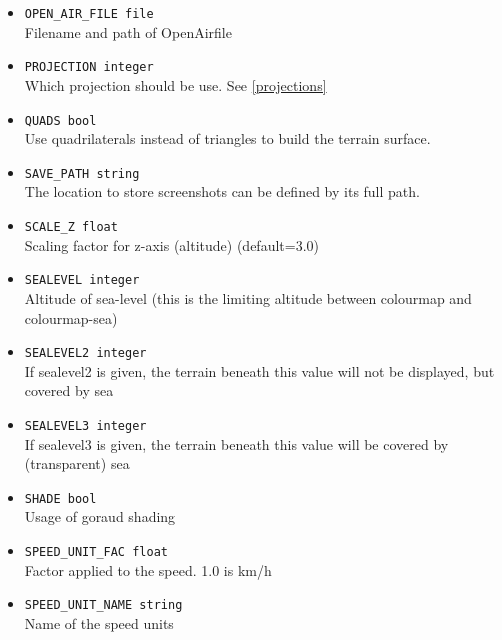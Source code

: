 \begin{itemize}

\item \texttt{OPEN\_AIR\_FILE file} \\
Filename and path of OpenAir\texttrademark  file

\item \texttt{PROJECTION integer} \\
Which projection should be use. See \ref{projections}

\item \texttt{QUADS bool} \\
Use quadrilaterals instead of triangles to build the terrain surface.

\item \texttt{SAVE\_PATH string}\\
The location to store screenshots can be defined by its full path.

\item \texttt{SCALE\_Z float} \\
Scaling factor for z-axis (altitude) (default=3.0)

\item \texttt{SEALEVEL integer} \\
Altitude of sea-level (this is the limiting altitude between colourmap and colourmap-sea)

\item \texttt{SEALEVEL2 integer} \\
If sealevel2 is given, the terrain beneath this value will not be displayed, but covered by sea

\item \texttt{SEALEVEL3 integer} \\
If sealevel3 is given, the terrain beneath this value will be covered by (transparent) sea

\item \texttt{SHADE bool} \\
Usage of goraud shading

\item \texttt{SPEED\_UNIT\_FAC float} \\
Factor applied to the speed. 1.0 is km/h

\item \texttt{SPEED\_UNIT\_NAME string} \\
Name of the speed units


\end{itemize}
